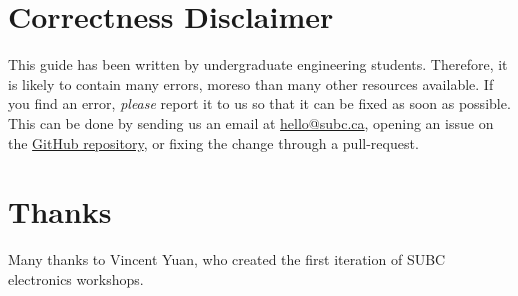 \section{Correctness Disclaimer}
This guide has been written by undergraduate engineering students. Therefore, it is likely to contain many errors, moreso than many other resources available. If you find an error, \emph{please} report it to us so that it can be fixed as soon as possible. This can be done by sending us an email at \href{mailto:hello@subc.ca}{hello@subc.ca}, opening an issue on the \href{https://github.com/UBC-SUBC/elec-embedded-fundamentals}{GitHub repository}, or fixing the change through a pull-request.

\section{Thanks}
Many thanks to Vincent Yuan, who created the first iteration of SUBC electronics workshops.
